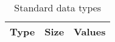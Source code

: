 \documentclass[a4paper, oneside, 11pt, article, english]{memoir}
\begin{document}
\begin{table}[htbp]
\begin{tabular}{@{}lp{9cm}@{}}
    \bottomrule
  \end{tabular}
\end{table}

\begin{table}[htbp]
  \centering
  \caption{Standard data types}
  \label{tab:datatypes}
  \begin{threeparttable}
    \begin{tabular}{@{}lll@{}}
      \toprule
      Type             & Size               & Values                                          \\
      \midrule

\end{tabular}
\end{threeparttable}
\end{table}
\end{document}
